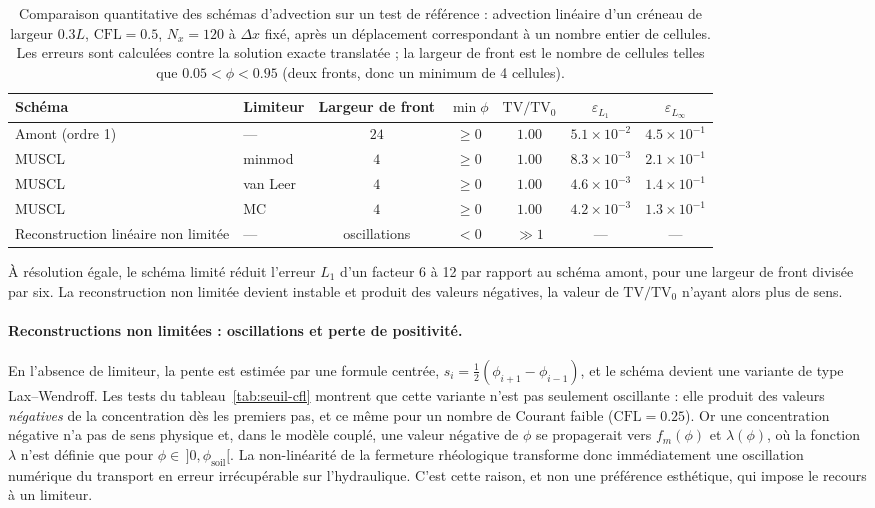 \documentclass[11pt,a4paper]{report}
\newcommand{\phisol}{\phi_{\mathrm{soil}}}
\begin{document}
\begin{table}[H]
\centering
\caption{Comparaison quantitative des schémas d'advection sur un test de référence : advection
linéaire d'un créneau de largeur \(0.3L\), \(\mathrm{CFL} = 0.5\), \(N_x = 120\) à \(\Delta x\) fixé, après
un déplacement correspondant à un nombre entier de cellules. Les erreurs sont calculées contre la
solution exacte translatée ; la largeur de front est le nombre de cellules telles que
\(0.05 < \phi < 0.95\) (deux fronts, donc un minimum de 4 cellules).}
\label{tab:fronts}
\small
\begin{tabular}{llccccc}
\toprule
Schéma & Limiteur & Largeur de front & \(\min\phi\) & \(\mathrm{TV}/\mathrm{TV}_0\)
& \(\varepsilon_{L_1}\) & \(\varepsilon_{L_\infty}\) \\
\midrule
Amont (ordre 1) & --- & \(24\) & \(\ge 0\) & \(1.00\) & \(5.1\times10^{-2}\) & \(4.5\times10^{-1}\) \\
MUSCL & minmod & \(4\) & \(\ge 0\) & \(1.00\) & \(8.3\times10^{-3}\) & \(2.1\times10^{-1}\) \\
MUSCL & van Leer & \(4\) & \(\ge 0\) & \(1.00\) & \(4.6\times10^{-3}\) & \(1.4\times10^{-1}\) \\
MUSCL & MC & \(4\) & \(\ge 0\) & \(1.00\) & \(4.2\times10^{-3}\) & \(1.3\times10^{-1}\) \\
Reconstruction linéaire non limitée & --- & oscillations & \(<0\) & \(\gg 1\) & --- & --- \\
\bottomrule
\end{tabular}
\begin{tablenotes}
\small
\item À résolution égale, le schéma limité réduit l'erreur \(L_1\) d'un facteur 6 à 12 par rapport au
schéma amont, pour une largeur de front divisée par six. La reconstruction non limitée devient
instable et produit des valeurs négatives, la valeur de \(\mathrm{TV}/\mathrm{TV}_0\) n'ayant alors
plus de sens.
\end{tablenotes}
\end{table}

\paragraph{Reconstructions non limitées : oscillations et perte de positivité.} En l'absence de
limiteur, la pente est estimée par une formule centrée, \(s_i = \frac{1}{2}(\phi_{i+1}-\phi_{i-1})\),
et le schéma devient une variante de type Lax--Wendroff. Les tests du tableau~\ref{tab:seuil-cfl} montrent
que cette variante n'est pas seulement oscillante : elle produit des valeurs \emph{négatives} de la
concentration dès les premiers pas, et ce même pour un nombre de Courant faible
(\(\mathrm{CFL} = 0.25\)). Or une concentration négative n'a pas de sens physique et, dans le modèle
couplé, une valeur négative de \(\phi\) se propagerait vers \(f_m(\phi)\) et \(\lambda(\phi)\), où la
fonction \(\lambda\) n'est définie que pour \(\phi \in\,]0,\phisol[\). La non-linéarité de la fermeture
rhéologique transforme donc immédiatement une oscillation numérique du transport en erreur irrécupérable
sur l'hydraulique. C'est cette raison, et non une préférence esthétique, qui impose le recours à un
limiteur.
\end{document}
